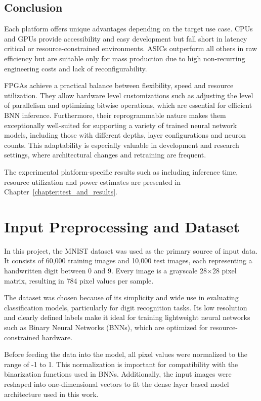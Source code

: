 \documentclass[a4paper,12pt]{report}
\begin{document}
\subsection{Conclusion}
Each platform offers unique advantages depending on the target use case. CPUs and GPUs provide accessibility and easy development but fall short in latency critical or resource-constrained environments. ASICs outperform all others in raw efficiency but are suitable only for mass production due to high non-recurring engineering costs and lack of reconfigurability.

FPGAs achieve a practical balance between flexibility, speed and resource utilization. They allow hardware level customizations such as adjusting the level of parallelism and optimizing bitwise operations, which are essential for efficient BNN inference. Furthermore, their reprogrammable nature makes them exceptionally well-suited for supporting a variety of trained neural network models, including those with different depths, layer configurations and neuron counts. This adaptability is especially valuable in development and research settings, where architectural changes and retraining are frequent. 

The experimental platform-specific results such as including inference time, resource utilization and power estimates are presented in Chapter~\ref{chapter:test_and_results}.


\clearpage
\section{Input Preprocessing and Dataset}
In this project, the MNIST dataset was used as the primary source of input data. It consists of 60,000 training images and 10,000 test images, each representing a handwritten digit between 0 and 9. Every image is a grayscale 28×28 pixel matrix, resulting in 784 pixel values per sample.

The dataset was chosen because of its simplicity and wide use in evaluating classification models, particularly for digit recognition tasks. Its low resolution and clearly defined labels make it ideal for training lightweight neural networks such as Binary Neural Networks (BNNs), which are optimized for resource-constrained hardware.

Before feeding the data into the model, all pixel values were normalized to the range of -1 to 1. This normalization is important for compatibility with the binarization functions used in BNNs. Additionally, the input images were reshaped into one-dimensional vectors to fit the dense layer based model architecture used in this work.
\end{document}
